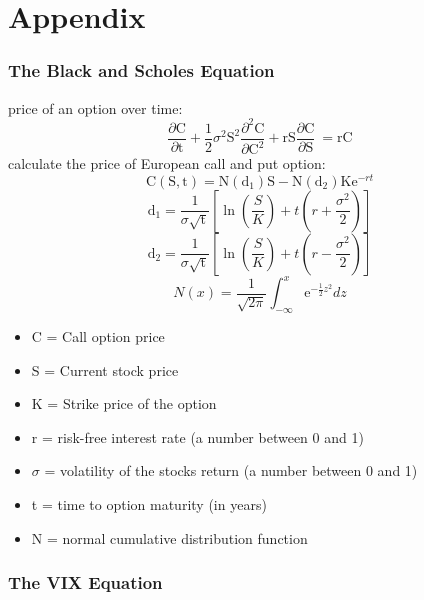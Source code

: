\documentclass[aspectratio=169]{beamer}
\begin{document}
\section{Appendix}
\begin{frame}
\frametitle{The Black and Scholes Equation}
%
\begin{minipage}{0.6\textwidth}
\begin{small}
%
price of an option over time:
\begin{equation}
	\frac{\partial \mathrm C}{ \partial \mathrm t } + \frac{1}{2}\sigma^{2} \mathrm S^{2} \frac{\partial^{2} \mathrm C}{\partial \mathrm C^2}
	+ \mathrm r \mathrm S \frac{\partial \mathrm C}{\partial \mathrm S}\ =
	\mathrm r \mathrm C 
	\label{eq:1}
\end{equation}
%
calculate the price of European call and put option: 
\begin{equation}
	\mathrm C(\mathrm S,\mathrm t)= \mathrm N(\mathrm d_1)\mathrm S - \mathrm N(\mathrm d_2) \mathrm K \mathrm e^{-rt}
	\label{eq:2}
\end{equation}
\vspace{-3pt}
%
\begin{equation}
	\mathrm d_1= \frac{1}{\sigma \sqrt{\mathrm t}} \left[\ln{\left(\frac{S}{K}\right)} + t\left(r + \frac{\sigma^2}{2} \right) \right]
\end{equation}
\vspace{-3pt}
%
\begin{equation}
	\mathrm d_2= \frac{1}{\sigma \sqrt{\mathrm t}} \left[\ln{\left(\frac{S}{K}\right)} + t\left(r - \frac{\sigma^2}{2} \right) \right]
\end{equation}
\vspace{-3pt}
%
\begin{equation}
	N(x)=\frac{1}{\sqrt{2\pi}} \int_{-\infty}^{x} \mathrm e^{-\frac{1}{2}z^2} dz
	\label{eq:5}
\end{equation}
\end{small}
\end{minipage}
%
\begin{minipage}{0.35\textwidth}
\begin{footnotesize}
\begin{itemize}
	\item[] C = Call option price 
	\item[] S = Current stock price
	\item[] K = Strike price of the option
	\item[] r = risk-free interest rate (a number between 0 and 1)
	\item[] $\sigma$ = volatility of the stocks return (a number between 0 and 1)
	\item[] t = time to option maturity (in years)
	\item[] N = normal cumulative distribution function
\end{itemize}
\end{footnotesize}
\end{minipage}
%
\end{frame}

\begin{frame}
\frametitle{The VIX Equation}
\end{frame}
\end{document}

